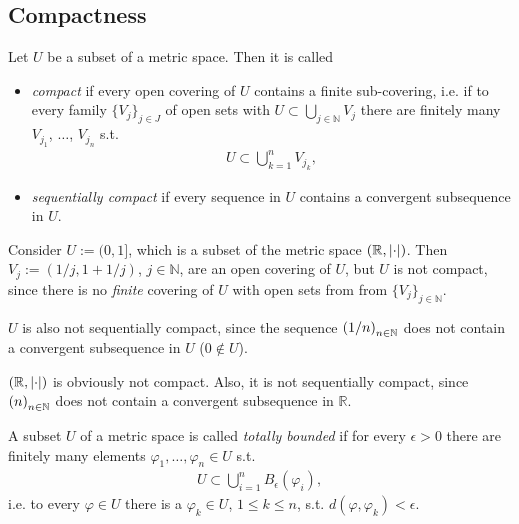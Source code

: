 \subsection{Compactness}
\begin{defn}[Compact]
	Let $U$ be a subset of a metric space. Then it is called 
	\begin{itemize}
		\item \textit{compact} if every open covering of $U$ contains a finite sub-covering, i.e. if to every family $\{V_j\}_{j\in J}$ of open sets with $U \subset \bigcup_{j\in\mathbb N} V_j$ there are finitely many $V_{j_1}$, $\dots$, $V_{j_n}$ s.t. 
		\begin{align*}
			U \subset \bigcup_{k = 1}^{n}V_{j_k},
		\end{align*}
		\item \textit{sequentially compact} if every sequence in $U$ contains a convergent subsequence in $U$.
	\end{itemize}
\end{defn}

\begin{exmp}
	Consider $U := (0, 1]$, which is a subset of the metric space $(\mathbb R, \abs{\cdot})$. Then $V_j := (1/j, 1 + 1/j)$, $j\in\mathbb N$, are an open covering of $U$, but $U$ is not compact, since there is no \textit{finite} covering of $U$ with open sets from from $\{V_j\}_{j\in\mathbb N}$.
	
	$U$ is also not sequentially compact, since the sequence $\seq[1/n]$ does not contain a convergent subsequence in $U$ ($0\notin U$).
\end{exmp}

\begin{exmp}
	$(\mathbb R, \abs{\cdot})$ is obviously not compact. Also, it is not sequentially compact, since $\seq[n]$ does not contain a convergent subsequence in $\mathbb R$.
\end{exmp}

\begin{defn}
	A subset $U$ of a metric space is called \textit{totally bounded} if for every $\epsilon > 0$ there are finitely many elements $\varphi_1, \dots, \varphi_n\in U$ s.t. 
	\begin{align*}
		U\subset \bigcup_{i = 1}^{n}B_{\epsilon}(\varphi_i),
	\end{align*}
	i.e. to every $\varphi\in U$ there is a $\varphi_k\in U$, $1\leq k\leq n$, s.t. $d(\varphi, \varphi_k) < \epsilon$.
\end{defn}

